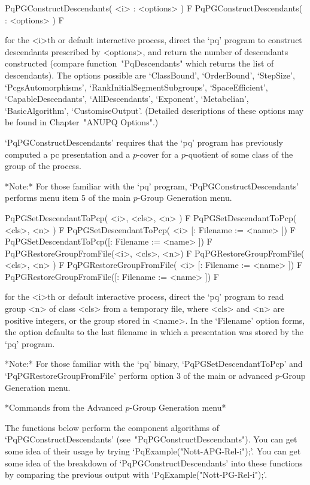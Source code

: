 \>PqPGConstructDescendants( <i> : <options> ) F
\>PqPGConstructDescendants( : <options> ) F

for the  <i>th or default  interactive {\ANUPQ} process, direct  the `pq'
program to construct descendants  prescribed by <options>, and return the
number of descendants constructed (compare function~"PqDescendants" which
returns the list of descendants).  The options possible are `ClassBound',
`OrderBound',               `StepSize',              `PcgsAutomorphisms',
`RankInitialSegmentSubgroups',   `SpaceEfficient',  `CapableDescendants',
`AllDescendants',     `Exponent',     `Metabelian',     `BasicAlgorithm',
`CustomiseOutput'.  (Detailed descriptions of  these options may be found
in Chapter~"ANUPQ Options".)

`PqPGConstructDescendants' requires that the `pq' program  has  previously
computed a pc presentation and a $p$-cover for  a  $p$-quotient  of  some
class of the group of the process.

*Note:* 
For those  familiar  with  the  `pq'  program,  `PqPGConstructDescendants'
performs menu item 5 of the main $p$-Group Generation menu.

\>PqPGSetDescendantToPcp( <i>, <cls>, <n> ) F
\>PqPGSetDescendantToPcp( <cls>, <n> ) F
\>PqPGSetDescendantToPcp( <i> [: Filename := <name> ]) F
\>PqPGSetDescendantToPcp([: Filename := <name> ]) F
\>PqPGRestoreGroupFromFile(<i>, <cls>, <n>) F
\>PqPGRestoreGroupFromFile( <cls>, <n> ) F
\>PqPGRestoreGroupFromFile( <i> [: Filename := <name> ]) F
\>PqPGRestoreGroupFromFile([: Filename := <name> ]) F

for the  <i>th or default  interactive {\ANUPQ} process, direct  the `pq'
program to  read group <n>  of class <cls>  from a temporary  file, where
<cls> and <n>  are positive integers, or the group  stored in <name>.  In
the `Filename' option forms, the  option defaults to the last filename in
which a presentation was stored by the `pq' program.

*Note:* 
For those familiar with the  `pq'  binary,  `PqPGSetDescendantToPcp'  and
`PqPGRestoreGroupFromFile' perform option  3  of  the  main  or  advanced
$p$-Group Generation menu.

\goodbreak%
*Commands from the Advanced $p$-Group Generation menu*

The   functions   below   perform    the    component    algorithms    of
`PqPGConstructDescendants' (see~"PqPGConstructDescendants"). You can  get
some idea of their usage by  trying  `PqExample("Nott-APG-Rel-i");'.  You
can get some idea of the  breakdown  of  `PqPGConstructDescendants'  into
these   functions    by    comparing    the    previous    output    with
`PqExample("Nott-PG-Rel-i");'. 

